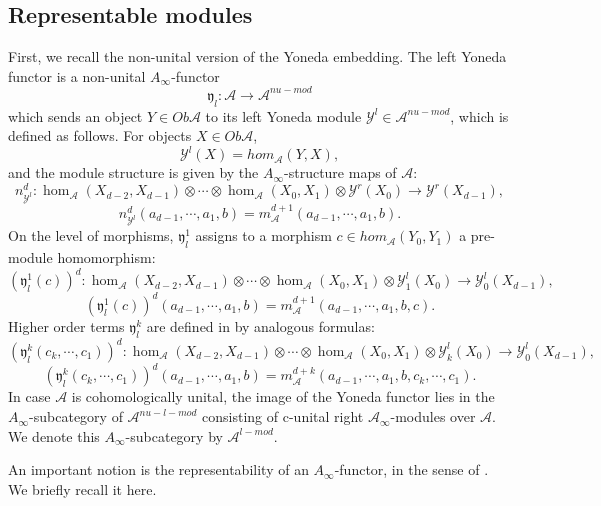 \documentclass{amsart}
\numberwithin{equation}{section}
\numberwithin{figure}{section}
\begin{document}
\subsection{Representable modules}
	First, we recall the non-unital version of the Yoneda embedding. The left Yoneda functor is a non-unital $A_{\infty}$-functor
\begin{equation}
\mathfrak{y}_{l}: \mathcal{A} \to \mathcal{A}^{nu-mod}
\end{equation}
which sends an object $Y \in Ob\mathcal{A}$ to its left Yoneda module $\mathcal{Y}^{l} \in \mathcal{A}^{nu-mod}$, which is defined as follows. For objects $X \in Ob\mathcal{A}$,
\begin{equation}
\mathcal{Y}^{l}(X) = hom_{\mathcal{A}}(Y, X),
\end{equation}
and the module structure is given by the $A_{\infty}$-structure maps of $\mathcal{A}$:
\begin{equation}
n_{\mathcal{Y}^{l}}^{d}: \hom_{\mathcal{A}}(X_{d-2}, X_{d-1}) \otimes \cdots \otimes \hom_{\mathcal{A}}(X_{0}, X_{1}) \otimes \mathcal{Y}^{r}(X_{0}) \to \mathcal{Y}^{r}(X_{d-1}),
\end{equation}
\begin{equation}
n_{\mathcal{Y}^{l}}^{d}(a_{d-1}, \cdots, a_{1}, b) = m^{d+1}_{\mathcal{A}}(a_{d-1}, \cdots, a_{1}, b).
\end{equation}
On the level of morphisms, $\mathfrak{y}_{l}^{1}$ assigns to a morphism $c \in hom_{\mathcal{A}}(Y_{0}, Y_{1})$ a pre-module homomorphism:
\begin{equation*}
(\mathfrak{y}_{l}^{1}(c))^{d}: \hom_{\mathcal{A}}(X_{d-2}, X_{d-1}) \otimes \cdots \otimes \hom_{\mathcal{A}}(X_{0}, X_{1}) \otimes \mathcal{Y}_{1}^{l}(X_{0}) \to \mathcal{Y}_{0}^{l}(X_{d-1}),
\end{equation*}
\begin{equation}
(\mathfrak{y}_{l}^{1}(c))^{d}(a_{d-1}, \cdots, a_{1}, b) = m^{d+1}_{\mathcal{A}}(a_{d-1}, \cdots, a_{1}, b, c).
\end{equation} 
Higher order terms $\mathfrak{y}_{l}^{k}$ are defined in by analogous formulas:
\begin{equation*}
(\mathfrak{y}_{l}^{k}(c_{k}, \cdots, c_{1}))^{d}: \hom_{\mathcal{A}}(X_{d-2}, X_{d-1}) \otimes \cdots \otimes \hom_{\mathcal{A}}(X_{0}, X_{1}) \otimes \mathcal{Y}_{k}^{l}(X_{0}) \to \mathcal{Y}_{0}^{l}(X_{d-1}),
\end{equation*}
\begin{equation}
(\mathfrak{y}_{l}^{k}(c_{k}, \cdots, c_{1}))^{d}(a_{d-1}, \cdots, a_{1}, b) = m^{d+k}_{\mathcal{A}}(a_{d-1}, \cdots, a_{1}, b, c_{k}, \cdots, c_{1}).
\end{equation}
	In case $\mathcal{A}$ is cohomologically unital, the image of the Yoneda functor lies in the $A_{\infty}$-subcategory of $\mathcal{A}^{nu-l-mod}$ consisting of c-unital right $\mathcal{A}_{\infty}$-modules over $\mathcal{A}$. We denote this $A_{\infty}$-subcategory by $\mathcal{A}^{l-mod}$. \par
	An important notion is the representability of an $A_{\infty}$-functor, in the sense of \cite{Fukaya1}. We briefly recall it here. \par
\end{document}
